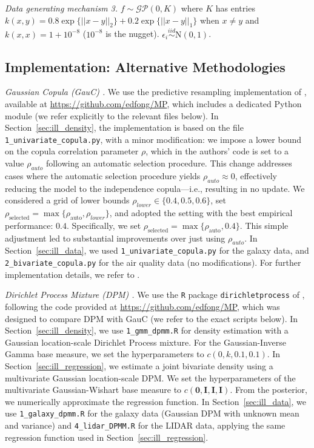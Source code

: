 \documentclass{article}
\theoremstyle{definition}
\newcommand{\iidsim}{\overset{iid}{\sim}} %
\renewcommand{\&}{and}
\begin{document}
\textit{Data generating mechanism 3.} $f\sim \mathcal{GP} (0, K)$ where $K$ has entries $k(x,y)=0.8\exp\{||x-y||_2\}+0.2\exp\{||x-y||_1\}$ when $x\neq y$ and $k(x,x)=1+10^{-8}$ ($10^{-8}$ is the nugget). $\epsilon_i \iidsim \text{N}(0,1)$. 

\subsection{Implementation: Alternative Methodologies}\label{sec:alternatives}

\noindent \textit{Gaussian Copula (GauC) \citep{hahn18}.} We use the predictive resampling implementation of \cite{fong2021martingale}, available at \url{https://github.com/edfong/MP}, which includes a dedicated Python module (we refer explicitly to the relevant files below). In Section~\ref{sec:ill_density}, the implementation is based on the file \texttt{1\_univariate\_copula.py}, with a minor modification: we impose a lower bound on the copula correlation parameter $\rho$, which in the authors' code is set to a value $\rho_{auto}$ following an automatic selection procedure. This change addresses cases where the automatic selection procedure yields $\rho_{auto} \approx 0$, effectively reducing the model to the independence copula—i.e., resulting in no update. We considered a grid of lower bounds $\rho_{lower}\in\{0.4, 0.5, 0.6\}$, set $\rho_{\text{selected}} = \max\{\rho_{\text{auto}}, \rho_{lower}\}$, and adopted the setting with the best empirical performance: $0.4$. Specifically, we set $\rho_{\text{selected}} = \max\{\rho_{\text{auto}}, 0.4\}$. This simple adjustment led to substantial improvements over just using $\rho_{auto}$. In Section~\ref{sec:ill_data}, we used \texttt{1\_univariate\_copula.py} for the galaxy data, and \texttt{2\_bivariate\_copula.py} for the air quality data (no modifications). For further implementation details, we refer to \cite{fong2021martingale}.

\noindent \textit{Dirichlet Process Mixture (DPM) \citep{lo84}.} We use the \texttt{R} package \texttt{dirichletprocess} of \cite{ross2018dirichletprocess}, following the code provided at \url{https://github.com/edfong/MP}, which was designed to compare DPM with GauC (we refer to the exact scripts below). In Section~\ref{sec:ill_density}, we use \texttt{1\_gmm\_dpmm.R} for density estimation with a Gaussian location-scale Dirichlet Process mixture. For the Gaussian-Inverse Gamma base measure, we set the hyperparameters to $c(0, k, 0.1, 0.1)$. In Section~\ref{sec:ill_regression}, we estimate a joint bivariate density using a multivariate Gaussian location-scale DPM. We set the hyperparameters of the multivariate Gaussian-Wishart base measure to $c(\textbf{0}, \textbf{I}, \textbf{I}, \textbf{I})$. From the posterior, we numerically approximate the regression function. In Section~\ref{sec:ill_data}, we use \texttt{1\_galaxy\_dpmm.R} for the galaxy data (Gaussian DPM with unknown mean and variance) and \texttt{4\_lidar\_DPMM.R} for the LIDAR data, applying the same regression function used in Section~\ref{sec:ill_regression}.
\end{document}
